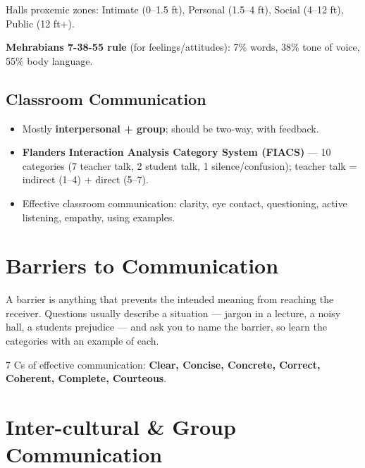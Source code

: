 \endgroup

Hall\textquotesingle s proxemic zones: Intimate (0--1.5 ft), Personal (1.5--4 ft), Social (4--12 ft), Public (12 ft+).

\textbf{Mehrabian\textquotesingle s 7-38-55 rule} (for feelings/attitudes): 7\% words, 38\% tone of voice, 55\% body language.

\needspace{95pt}

\hypertarget{p1-04--classroom-communication}{%
\subsection{Classroom Communication}\label{p1-04--classroom-communication}}

\begin{itemize}
\tightlist
\item
  Mostly \textbf{interpersonal + group}; should be two-way, with feedback.
\item
  \textbf{Flanders\textquotesingle{} Interaction Analysis Category System (FIACS)} --- 10 categories (7 teacher talk, 2 student talk, 1 silence/confusion); teacher talk = indirect (1--4) + direct (5--7).
\item
  Effective classroom communication: clarity, eye contact, questioning, active listening, empathy, using examples.
\end{itemize}

\needspace{125pt}

\hypertarget{p1-04--4-barriers-to-communication}{%
\section{Barriers to Communication}\label{p1-04--4-barriers-to-communication}}

A barrier is anything that prevents the intended meaning from reaching the receiver. Questions usually
describe a situation --- jargon in a lecture, a noisy hall, a student\textquotesingle s prejudice --- and ask you to name the
barrier, so learn the categories with an example of each.



7 Cs of effective communication: \textbf{Clear, Concise, Concrete, Correct, Coherent, Complete, Courteous}.

\needspace{125pt}

\hypertarget{p1-04--5-inter-cultural--group-communication}{%
\section{Inter-cultural \& Group Communication}\label{p1-04--5-inter-cultural--group-communication}}

